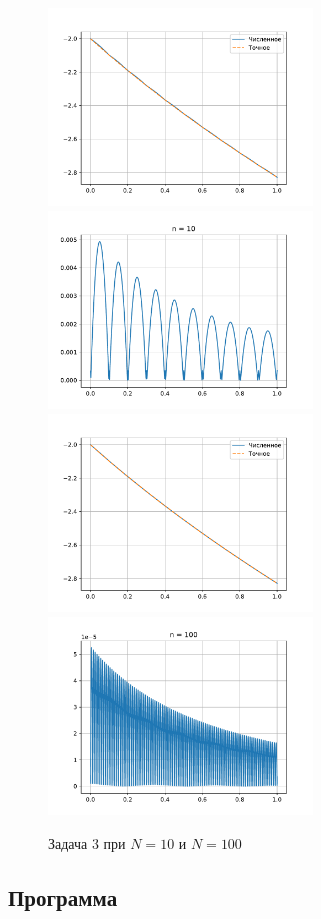 \begin{figure}[H]
    \centering
    \includegraphics[width=7cm]{pictures/plot3_10.pdf}
    \includegraphics[width=7cm]{pictures/diff3_10.pdf}
    \includegraphics[width=7cm]{pictures/plot3_100.pdf}
    \includegraphics[width=7cm]{pictures/diff3_100.pdf}
    \caption{Задача 3 при \(N = 10\) и \(N = 100\)}\label{z3p}
\end{figure}

\subsection{Программа}


